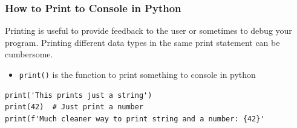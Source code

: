 \documentclass[10pt, a4paper]{beamer} %
\begin{document}
\begin{frame}[c, fragile]\frametitle{How to Print to Console in Python}
  Printing is useful to provide feedback to the user or sometimes to debug your program. Printing different data types
  in the same print statement can be cumbersome.
  \begin{itemize}
    \item \texttt{print()} is the function to print something to console in python
  \end{itemize}

\begin{lstlisting}
print('This prints just a string') 
print(42)  # Just print a number
print(f'Much cleaner way to print string and a number: {42}'
\end{lstlisting}


\end{frame}
\end{document}
